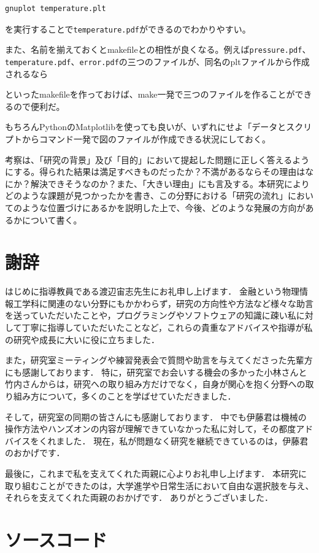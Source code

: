 \documentclass[titlepage]{jsreport}
\begin{document}
\begin{lstlisting}[language=bash]
gnuplot temperature.plt
\end{lstlisting}

を実行することで\verb|temperature.pdf|ができるのでわかりやすい。

また、名前を揃えておくとmakefileとの相性が良くなる。例えば\verb|pressure.pdf|、\verb|temperature.pdf|、\verb|error.pdf|の三つのファイルが、同名のpltファイルから作成されるなら



といったmakefileを作っておけば、make一発で三つのファイルを作ることができるので便利だ。

もちろんPythonのMatplotlibを使っても良いが、いずれにせよ「データとスクリプトからコマンド一発で図のファイルが作成できる状況にしておく。

考察は、「研究の背景」及び「目的」において提起した問題に正しく答えるようにする。得られた結果は満足すべきものだったか？不満があるならその理由はなにか？解決できそうなのか？また、「大きい理由」にも言及する。本研究によりどのような課題が見つかったかを書き、この分野における「研究の流れ」においてのような位置づけにあるかを説明した上で、今後、どのような発展の方向があるかについて書く。

\chapter*{謝辞}
はじめに指導教員である渡辺宙志先生にお礼申し上げます．
金融という物理情報工学科に関連のない分野にもかかわらず，研究の方向性や方法など様々な助言を送っていただいたことや，プログラミングやソフトウェアの知識に疎い私に対して丁寧に指導していただいたことなど，これらの貴重なアドバイスや指導が私の研究や成長に大いに役に立ちました．


また，研究室ミーティングや練習発表会で質問や助言を与えてくださった先輩方にも感謝しております．
特に，研究室でお会いする機会の多かった小林さんと竹内さんからは，研究への取り組み方だけでなく，自身が関心を抱く分野への取り組み方について，多くのことを学ばせていただきました．

そして，研究室の同期の皆さんにも感謝しております．
中でも伊藤君は機械の操作方法やハンズオンの内容が理解できていなかった私に対して，その都度アドバイスをくれました．
現在，私が問題なく研究を継続できているのは，伊藤君のおかげです．

最後に，これまで私を支えてくれた両親に心よりお礼申し上げます．
本研究に取り組むことができたのは，大学進学や日常生活において自由な選択肢を与え、それらを支えてくれた両親のおかげです．
ありがとうございました．

\appendix

\chapter{ソースコード}





\end{document}

